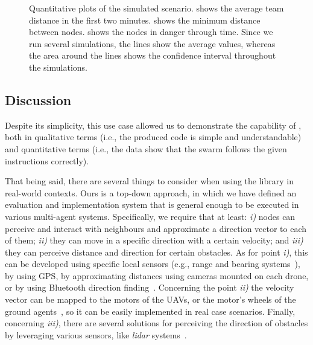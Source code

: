 \begin{figure}[t]
\begin{subfigure}{0.4\textwidth}
  \caption{}
  \label{coordination2023-macro:fig:danger}
\end{subfigure}
\caption[Quantitative plots of the simulated scenario in \MacroSwarm{}.]{
  Quantitative plots of the simulated scenario. 
   shows the average team distance in the first two minutes. 
   shows the minimum distance between nodes. 
   shows the nodes in danger through time. 
  Since we run several simulations, 
   the lines show the average values, whereas 
   the area around the lines shows the confidence interval throughout the simulations.
}\label{coordination2023-macro:fig:results}
\end{figure}

\subsection{Discussion}\label{coordination2023-macro:subsec:discussion}
%
Despite its simplicity, 
this use case allowed us to demonstrate the capability of \MacroSwarm{}, both in qualitative terms (i.e., the produced code is simple and understandable) and quantitative terms (i.e., the data show that the swarm follows the given instructions correctly).

That being said, there are several things to consider when using the library in real-world contexts. Ours is a top-down approach, in which we have defined an evaluation and implementation system that is general enough to be executed in various multi-agent systems. Specifically, we require that at least: 
\emph{i)} nodes can perceive and interact with neighbours and approximate a direction vector to each of them; 
\emph{ii)} they can move in a specific direction with a certain velocity; and 
\emph{iii)} they can perceive distance and direction for certain obstacles.
%
As for point \emph{i)}, this can be developed using specific local sensors (e.g., range and bearing systems~\cite{DBLP:conf/antsw/BilalogluSAST22}), by using GPS, by approximating distances using cameras mounted on each drone, or by using Bluetooth direction finding~\cite{DBLP:conf/wcnc/SambuW22}.
% 
Concerning the point \emph{ii)} the velocity vector can be mapped to the motors of the UAVs, or the motor's wheels of the ground agents~\cite{DBLP:conf/icra/KorenB91}, so it can be easily implemented in real case scenarios.
%
Finally, concerning \emph{iii)}, there are several solutions for perceiving the direction of obstacles by leveraging various sensors, like \emph{\ac{lidar}} systems~\cite{DBLP:conf/icinfa/PengQZXLG15}.


